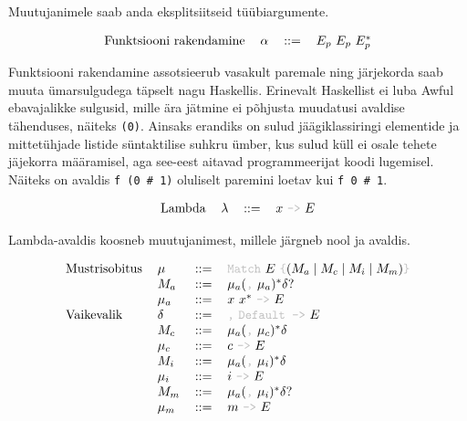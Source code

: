 \documentclass[12pt]{article}
\begin{document}
      Muutujanimele saab anda eksplitsiitseid tüübiargumente.

      \begin{equation*}
        \begin{tabular}{llll}
          Funktsiooni rakendamine & $\alpha$ & $::=$ & $E_p$ $E_p$ $E_p^*$
        \end{tabular}
      \end{equation*}

      Funktsiooni rakendamine assotsieerub vasakult paremale ning järjekorda saab muuta ümarsulgudega täpselt nagu Haskellis. Erinevalt Haskellist ei luba Awful ebavajalikke sulgusid, mille ära jätmine ei põhjusta muudatusi avaldise tähenduses, näiteks \verb!(0)!. Ainsaks erandiks on sulud jäägiklassiringi elementide ja mittetühjade listide süntaktilise suhkru ümber, kus sulud küll ei osale tehete jäjekorra määramisel, aga see-eest aitavad programmeerijat koodi lugemisel. Näiteks on avaldis \verb!f (0 # 1)! oluliselt paremini loetav kui \verb!f 0 # 1!.

      \begin{equation*}
        \begin{tabular}{llll}
          Lambda & $\lambda$ & $::=$ & $x$ {\color{helehall}\verb!->!} $E$
        \end{tabular}
      \end{equation*}

      Lambda-avaldis koosneb muutujanimest, millele järgneb nool ja avaldis.

      \begin{equation*}
        \begin{tabular}{llll}
          Mustrisobitus & $\mu$    & $::=$ & {\color{helehall}\verb!Match!} $E$ {\color{helehall}\verb!{!}$(M_a\mid M_c\mid M_i\mid M_m)${\color{helehall}\verb!}!} \\
                        & $M_a$    & $::=$ & $\mu_a(${\color{helehall}\verb!,!} $\mu_a)^*\delta?$ \\
                        & $\mu_a$  & $::=$ & $x$ $x^*$ {\color{helehall}\verb!->!} $E$ \\
          Vaikevalik    & $\delta$ & $::=$ & {\color{helehall}\verb!,!} {\color{helehall}\verb!Default ->!} $E$ \\
                        & $M_c$    & $::=$ & $\mu_a(${\color{helehall}\verb!,!} $\mu_c)^*\delta$ \\
                        & $\mu_c$  & $::=$ & $c$ {\color{helehall}\verb!->!} $E$ \\
                        & $M_i$    & $::=$ & $\mu_a(${\color{helehall}\verb!,!} $\mu_i)^*\delta$ \\
                        & $\mu_i$  & $::=$ & $i$ {\color{helehall}\verb!->!} $E$ \\
                        & $M_m$    & $::=$ & $\mu_a(${\color{helehall}\verb!,!} $\mu_i)^*\delta?$ \\
                        & $\mu_m$  & $::=$ & $m$ {\color{helehall}\verb!->!} $E$
        \end{tabular}
      \end{equation*}
\end{document}
